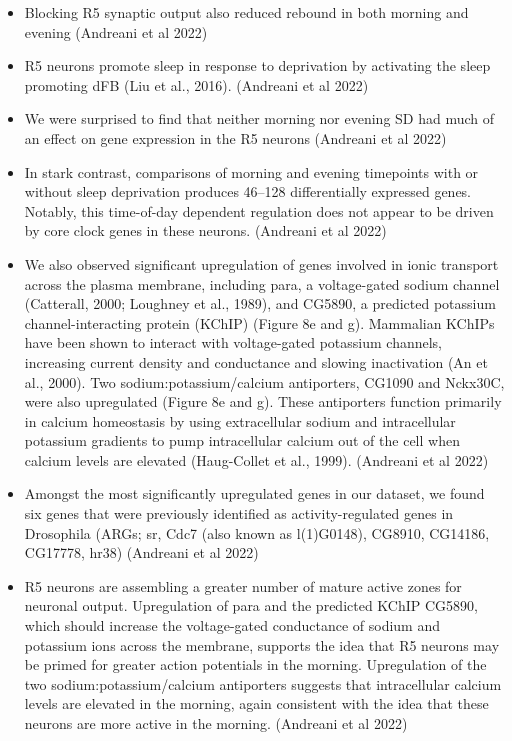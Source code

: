 \documentclass[11pt]{article}
\begin{document}
\begin{itemize}
    \item Blocking R5 synaptic output also reduced rebound in both morning and evening
    \cite{andreaniCircadianProgrammingEllipsoid2022} (Andreani et al 2022)

    \item R5 neurons promote sleep in response to deprivation by activating the sleep promoting dFB (Liu et al., 2016).
    \cite{andreaniCircadianProgrammingEllipsoid2022} (Andreani et al 2022)

    \item We were surprised to find that neither morning nor evening SD had much of an effect on gene expression in the R5 neurons
    \cite{andreaniCircadianProgrammingEllipsoid2022} (Andreani et al 2022)

    \item In stark contrast, comparisons of morning and evening timepoints with or without sleep deprivation produces 46–128 differentially expressed genes. Notably, this time-of-day dependent regulation does not appear to be driven by core clock genes in these neurons.
    \cite{andreaniCircadianProgrammingEllipsoid2022} (Andreani et al 2022)

    \item We also observed significant upregulation of genes involved in ionic transport across the plasma membrane, including para, a voltage-gated sodium channel (Catterall, 2000; Loughney et al., 1989), and CG5890, a predicted potassium channel-interacting protein (KChIP) (Figure 8e and g). Mammalian KChIPs have been shown to interact with voltage-gated potassium channels, increasing current density and conductance and slowing inactivation (An et al., 2000). Two sodium:potassium/calcium antiporters, CG1090 and Nckx30C, were also upregulated (Figure 8e and g). These antiporters function primarily in calcium homeostasis by using extracellular sodium and intracellular potassium gradients to pump intracellular calcium out of the cell when calcium levels are elevated (Haug-Collet et al., 1999).
    \cite{andreaniCircadianProgrammingEllipsoid2022} (Andreani et al 2022)

    \item Amongst the most significantly upregulated genes in our dataset, we found six genes that were previously identified as activity-regulated genes in Drosophila (ARGs; sr, Cdc7 (also known as l(1)G0148), CG8910, CG14186, CG17778, hr38)
    \cite{andreaniCircadianProgrammingEllipsoid2022} (Andreani et al 2022)

    \item R5 neurons are assembling a greater number of mature active zones for neuronal output. Upregulation of para and the predicted KChIP CG5890, which should increase the voltage-gated conductance of sodium and potassium ions across the membrane, supports the idea that R5 neurons may be primed for greater action potentials in the morning. Upregulation of the two sodium:potassium/calcium antiporters suggests that intracellular calcium levels are elevated in the morning, again consistent with the idea that these neurons are more active in the morning.
    \cite{andreaniCircadianProgrammingEllipsoid2022} (Andreani et al 2022)


\end{itemize}
\end{document}
